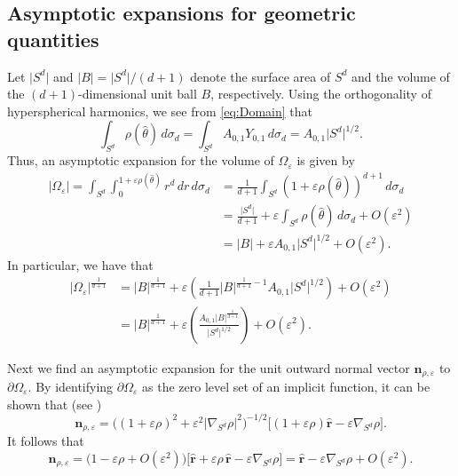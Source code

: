 \documentclass[11pt]{amsart}
\theoremstyle{definition}
\theoremstyle{plain}
\theoremstyle{remark}
\newcommand{\vareps}{\varepsilon}
\newcommand{\del}{\partial}
\newcommand{\n}{\mathbf{n}}
\renewcommand{\vec}[1]{\hat{\boldsymbol{#1}}}
\newcommand{\abs}[1]{\lvert{#1}\rvert}
\begin{document}
\subsection{Asymptotic expansions for geometric quantities} 
Let $\abs{S^d}$ and $\abs{B} = \abs{S^d}/(d + 1)$ denote the surface area of $S^d$ and the volume of the $(d + 1)$-dimensional unit ball $B$, respectively. Using the orthogonality of hyperspherical harmonics, we see from \eqref{eq:Domain} that 
\begin{equation*} 
\int_{S^d} \rho(\hat\theta)\, d\sigma_d = \int_{S^d} A_{0, 1}Y_{0, 1}\, d\sigma_d = A_{0, 1}\abs{S^d}^{1/2}. 
\end{equation*} 
Thus, an asymptotic expansion for the volume of $\Omega_\vareps$ is given by
\begin{align*} 
\abs{\Omega_\vareps} = \int_{S^d} \int_0^{1 + \vareps\rho(\hat\theta)} r^d\, dr\, d\sigma_d & = \frac{1}{d + 1}\int_{S^d} \left(1 + \vareps\rho(\hat\theta)\right)^{d + 1}\, d\sigma_d \\ 
& = \frac{\abs{S^d}}{d + 1} + \vareps\int_{S^d} \rho(\hat\theta)\, d\sigma_d + O(\vareps^2) \\ 
& = \abs{B} + \vareps A_{0, 1}\abs{S^d}^{1/2} + O(\vareps^2). 
\end{align*} 
In particular, we have that 
\begin{equation} \label{eq:Asymp_volume} 
\begin{aligned}  
\abs{\Omega_\vareps}^{\frac{1}{d + 1}} & = \abs{B}^{\frac{1}{d + 1}} + \vareps\left(\frac{1}{d + 1}\abs{B}^{\frac{1}{d + 1} - 1}A_{0, 1}\abs{S^d}^{1/2}\right) + O(\vareps^2) \\ 
& = \abs{B}^{\frac{1}{d + 1}} + \vareps\left(\frac{A_{0, 1}\abs{B}^{\frac{1}{d + 1}}}{\abs{S^d}^{1/2}}\right) + O(\vareps^2). 
\end{aligned} 
\end{equation} 


Next we find an asymptotic expansion for the unit outward normal vector $\n_{\rho, \vareps}$ to $\del\Omega_\vareps$. By identifying $\del\Omega_\vareps$ as the zero level set of an implicit function, it can be shown that (see \cite[Section 5]{tan2023}) 
\begin{equation*} 
\n_{\rho, \vareps} = \Big((1 + \vareps\rho)^2 + \vareps^2\abs{\nabla_{S^d}\rho}^2\Big)^{-1/2}\Big[(1 + \vareps\rho)\vec{r} - \vareps\nabla_{S^d}\rho\Big]. 
\end{equation*} 
It follows that 
\begin{equation} \label{eq:Asymp_normal} 
\n_{\rho, \vareps} = \Big(1 - \vareps\rho + O(\vareps^2)\Big)\Big[\vec{r} + \vareps\rho\, \vec{r} - \vareps\nabla_{S^d}\rho\Big] = \vec{r} - \vareps\nabla_{S^d}\rho + O(\vareps^2). 
\end{equation} 
\end{document}
